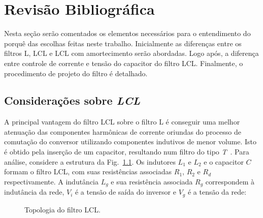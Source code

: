 
\chapter{Revisão Bibliográfica}\label{revisao}

    Nesta seção serão comentados os elementos necessários para o entendimento do
    porquê das escolhas feitas neste trabalho. Inicialmente as diferenças entre
    os filtros L, LCL e LCL com amortecimento serão abordadas. Logo após, a
    diferença entre controle de corrente e tensão do capacitor do filtro LCL.
    Finalmente, o procedimento de projeto do filtro é detalhado.


\section{Considerações sobre \textit{LCL}}

    A principal vantagem do filtro LCL sobre o filtro L é conseguir uma melhor
    atenuação das componentes harmônicas de corrente oriundas do processo de comutação do
    conversor utilizando componentes indutivos de menor volume. Isto é obtido pela
    inserção de um capacitor, resultando num filtro do tipo \textit{T}~\cite{ref:SHEN}.
    Para análise, considere a estrutura da Fig.~\ref{fig:LCL_topologia}. Os indutores
    $L_1$ e $L_2$ e o capacitor $C$ formam o filtro LCL, com suas resistências
    associadas $R_1$, $R_2$ e $R_d$ respectivamente. A indutância $L_g$ e sua
    resistência associada $R_g$ correspondem à indutância da rede, $V_i$
    é a tensão de saída do inversor e $V_g$ é a tensão da rede:

    \begin{figure}[htb]
        \renewcommand\figurename{Fig.}
        \caption{Topologia do filtro LCL.}
        \label{fig:LCL_topologia}
    \end{figure}

